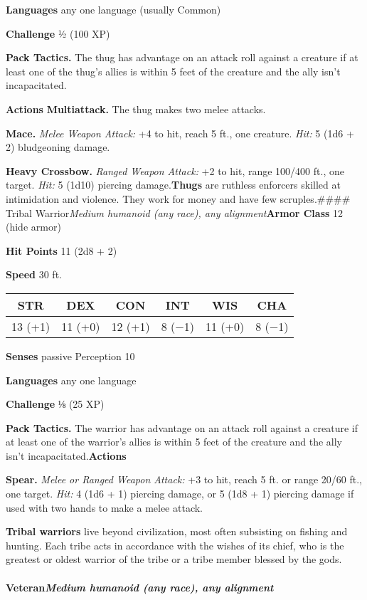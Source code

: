 \documentclass[
]{article}
\begin{document}
\textbf{Languages} any one language (usually Common)

\textbf{Challenge} ½ (100 XP)

\textbf{Pack Tactics.} The thug has advantage on an attack roll against
a creature if at least one of the thug's allies is within 5 feet of the
creature and the ally isn't incapacitated.

\textbf{Actions} \textbf{Multiattack.} The thug makes two melee attacks.

\textbf{Mace.} \emph{Melee Weapon Attack:} +4 to hit, reach 5 ft., one
creature. \emph{Hit:} 5 (1d6 + 2) bludgeoning damage.

\textbf{Heavy Crossbow.} \emph{Ranged Weapon Attack:} +2 to hit, range
100/400 ft., one target. \emph{Hit:} 5 (1d10) piercing
damage.\textbf{Thugs} are ruthless enforcers skilled at intimidation and
violence. They work for money and have few scruples.\#\#\#\# Tribal
Warrior\emph{Medium humanoid (any race), any alignment}\textbf{Armor
Class} 12 (hide armor)

\textbf{Hit Points} 11 (2d8 + 2)

\textbf{Speed} 30 ft.

\begin{longtable}[]{@{}cccccc@{}}
\toprule
STR & DEX & CON & INT & WIS & CHA\tabularnewline
\midrule
\endhead
13 (+1) & 11 (+0) & 12 (+1) & 8 (−1) & 11 (+0) & 8 (−1)\tabularnewline
\bottomrule
\end{longtable}

\textbf{Senses} passive Perception 10

\textbf{Languages} any one language

\textbf{Challenge} ⅛ (25 XP)

\textbf{Pack Tactics.} The warrior has advantage on an attack roll
against a creature if at least one of the warrior's allies is within 5
feet of the creature and the ally isn't incapacitated.\textbf{Actions}

\textbf{Spear.} \emph{Melee or Ranged Weapon Attack:} +3 to hit, reach 5
ft. or range 20/60 ft., one target. \emph{Hit:} 4 (1d6 + 1) piercing
damage, or 5 (1d8 + 1) piercing damage if used with two hands to make a
melee attack.

\textbf{Tribal warriors} live beyond civilization, most often subsisting
on fishing and hunting. Each tribe acts in accordance with the wishes of
its chief, who is the greatest or oldest warrior of the tribe or a tribe
member blessed by the gods.

\hypertarget{veteranmedium-humanoid-any-race-any-alignment}{%
\paragraph{\texorpdfstring{Veteran\emph{Medium humanoid (any race), any
alignment}}{VeteranMedium humanoid (any race), any alignment}}\label{veteranmedium-humanoid-any-race-any-alignment}}
\end{document}
